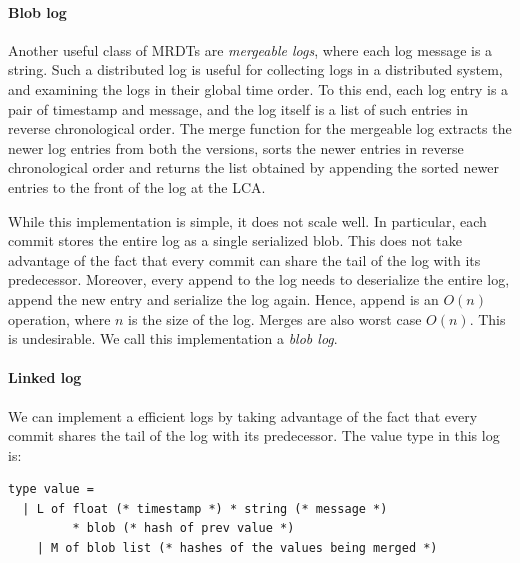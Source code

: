 \paragraph*{\textbf{Blob log}} Another useful class of MRDTs are
\emph{mergeable logs}, where each log message is a string. Such a distributed
log is useful for collecting logs in a distributed system, and examining the
logs in their global time order. To this end, each log entry is a pair of
timestamp and message, and the log itself is a list of such entries in reverse
chronological order. The merge function for the mergeable log extracts the
newer log entries from both the versions, sorts the newer entries in reverse
chronological order and returns the list obtained by appending the sorted newer
entries to the front of the log at the LCA.

While this implementation is simple, it does not scale well. In particular,
each commit stores the entire log as a single serialized blob. This does not
take advantage of the fact that every commit can share the tail of the log with
its predecessor. Moreover, every append to the log needs to deserialize the
entire log, append the new entry and serialize the log again. Hence, append is
an $O(n)$ operation, where $n$ is the size of the log. Merges are also worst
case $O(n)$. This is undesirable. We call this implementation a \emph{blob
log}.

\paragraph*{\textbf{Linked log}} We can implement a efficient logs by taking
advantage of the fact that every commit shares the tail of the log with its
predecessor. The value type in this log is:

\begin{lstlisting}
type value =
  | L of float (* timestamp *) * string (* message *)
	     * blob (* hash of prev value *)
	| M of blob list (* hashes of the values being merged *)
\end{lstlisting}


